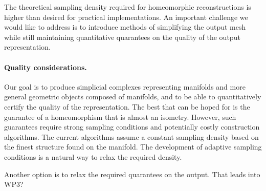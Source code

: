 The theoretical sampling density required for homeomorphic
reconstructions is higher than desired for practical
implementations. An important challenge we would like to address is to
introduce methods of simplifying the output mesh while still
maintaining quantitative quarantees on the quality of the output
representation. 


\paragraph{Quality considerations.}
Our goal is to produce simplicial complexes representing manifolds and
more general geometric objects composed of manifolds, and to be able
to quantitatively certify the quality of the representation. The best
that can be hoped for is the guarantee of a homeomorphism that is
almost an isometry. However, such guarantees require strong sampling
conditions and potentially costly construction algorithms. The current
algorithms assume a constant sampling density based on the finest
structure found on the manifold. The development of adaptive sampling
conditions is a natural way to relax the required density. 

Another option is to relax the required quarantees on the output. That
leads into WP3?
